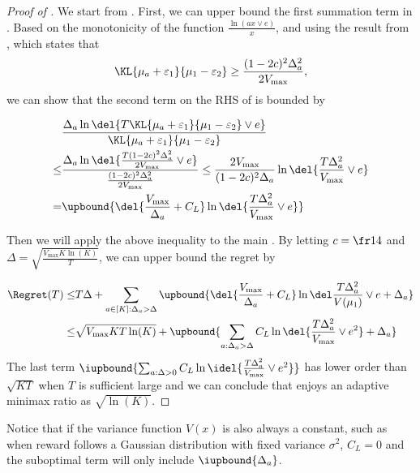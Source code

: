\begin{proof}[Proof of ]
    We start from . First, we can upper bound the first summation term in . Based on the monotonicity of the function $\tfrac{\ln(ax \vee e)}{x}$, and using the result from , which states that 
    \[
    \KL{\mu_a + \varepsilon_1}{\mu_1 - \varepsilon_2} \geq \frac{(1-2c)^2 \Delta_a^2}{2V_{\max}},
    \]
    we can show that the second term on the RHS of  is bounded by 


    
    \begin{align}
        &
        \frac{\Delta_a\ln\del{T\KL{\mu_a+\varepsilon_1}{\mu_1-\varepsilon_2} \vee e}}{\KL{\mu_a+\varepsilon_1}{\mu_1-\varepsilon_2}}
            \nonumber
        \\
        \leq&
        \frac{\Delta_a\ln\del{ \frac{T(1-2c)^2\Delta_a^2}{2V_{\max}} \vee e}}{\frac{(1-2c)^2\Delta_a^2}{2V_{\max}}}
        \leq
            \frac{2V_{\max}}{(1-2c)^2 \Delta_a}\ln\del{\frac{T\Delta_a^2}{V_{\max}} \vee e}
            \nonumber
        \\
        =&
        \upbound{\del{\frac{V_{\max}}{\Delta_a} + C_L}\ln\del{\frac{T\Delta_a^2}{V_{\max}} \vee e}}
            \label{eqn:bound-of-leading-term}
    \end{align}

    Then we will apply the above inequality to the main . By letting $c = \fr14$ and $\Delta = \sqrt{\tfrac{V_{\max}K \ln(K)}{T}}$, we can upper bound the regret by

    \begin{align*}
        \Regret(T)
        \leq&
        T\Delta + \sum_{a\in[K]:\Delta_a > \Delta} \upbound{\del{\frac{V_{\max}}{\Delta_a} + C_L} \LogFactorInRegretBound + \Delta_a}
        \\
        \leq&
        \sqrt{V_{\max} K T \ln(K)} +
        \upbound{\sum_{a:\Delta_a>\Delta} C_L \ln\del{\frac{T\Delta_a^2}{V_{\max}} \vee e^2} + \Delta_a}
    \end{align*}
    The last term $\iupbound{ \sum_{a:\Delta>0} C_L \ln\idel{\frac{T\Delta_a^2}{V_{\max}} \vee e^2}}$ has lower order than $\sqrt{KT}$ when $T$ is sufficient large and we can conclude that \expklms enjoys an adaptive minimax ratio as $\sqrt{\ln(K)}$.
\end{proof}
Notice that if the variance function $V(x)$ is also always a constant, such as when reward follows a Gaussian distribution with fixed variance $\sigma^2$, $C_L = 0$ and the suboptimal term will only include $\iupbound{\Delta_a}$. 


